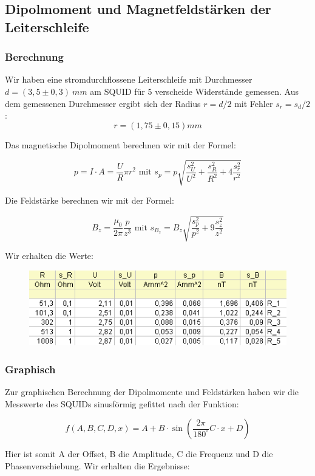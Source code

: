 \subsection{Dipolmoment und Magnetfeldstärken der Leiterschleife}

\subsubsection{Berechnung}

Wir haben eine stromdurchflossene Leiterschleife mit Durchmesser $d = (3,5 \pm 0,3)\ mm$ am SQUID für 5 verscheide Widerstände gemessen. Aus dem gemessenen Durchmesser ergibt sich der Radius $r=d/2$ mit Fehler $s_r = s_d/2$: $$r = (1,75 \pm 0,15) mm$$

Das magnetische Dipolmoment berechnen wir mit der Formel:

$$p = I\cdot A = \frac{U}{R}\pi r^2 \text{ \ \ \ mit \ \ \ } s_p = p\sqrt{\frac{s_U^2}{U^2} + \frac{s_R^2}{R^2} + 4\frac{s_r^2}{r^2}}$$

Die Feldstärke berechnen wir mit der Formel:

$$B_z = \frac{\mu_0}{2\pi}\frac{p}{z^3} \text{ \ \ \ mit \ \ \ } s_{B_z}=B_z\sqrt{\frac{s_p^2}{p^2} + 9 \frac{s_z^2}{z^2}}$$

Wir erhalten die Werte:

\begin{figure}[H]
	\centering \includegraphics{Bilder/Tab-Leiterschleife.png}
\end{figure}

\subsubsection{Graphisch}

Zur graphischen Berechnung der Dipolmomente und Feldstärken haben wir die Messwerte des SQUIDs sinusförmig gefittet nach der Funktion:

$$ f\left(A,B,C,D,x \right) = A + B\cdot\sin\left(\frac{2 \pi}{180^\circ} C\cdot x + D\right) $$

Hier ist somit A der Offset, B die Amplitude, C die Frequenz und D die Phasenverschiebung. Wir erhalten die Ergebnisse:

